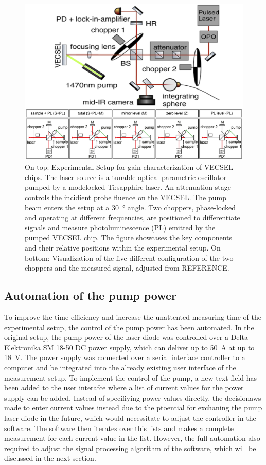 \begin{figure}[ht]
    \centering
    \includegraphics[width=0.8\linewidth]{images/setup.png}
    \caption{On top: Experimental Setup for gain characterization of VECSEL chips. The laser source is a tunable optical parametric oscillator pumped by a modelocked Ti:sapphire laser. An attenuation stage controls the incidient probe fluence on the VECSEL. The pump beam enters the setup at a \qty{30}{\degree} angle. Two choppers, phase-locked and operating at different frequencies, are positioned to differentiate signals and measure photoluminescence (PL) emitted by the pumped VECSEL chip. The figure showcases the key components and their relative positions within the experimental setup.
    On bottom: Visualization of the five different configuration of the two choppers and the measured signal, adjusted from REFERENCE.}
    \label{fig:setup}
\end{figure}

\subsection{Automation of the pump power}{\label{subsubsection:pump}}

To improve the time efficiency and increase the unattented measuring time of the experimental setup, the control of the pump power has been automated. In the original setup, the pump power of the laser diode was controlled over a Delta Elektronika SM 18-50 DC power supply, which can deliver up to \qty{50}{\ampere} at up to \qty{18}{\volt}. The power supply was connected over a serial interface controller to a computer and be integrated into the already existing user interface of the measurement setup. To implement the control of the pump, a new text field has been added to the user interafce where a list of current values for the power supply can be added. Instead of specifiying power values directly, the decisionaws made to enter current values instead due to the ptoential for exchaning the pump laser diode in the future, which would necessitate to adjust the controller in the software. The software then iterates over this lists and makes a complete measurement for each current value in the list. However, the full automation also required to adjust the signal processing algorithm of the software, which will be discussed in the next section. 

